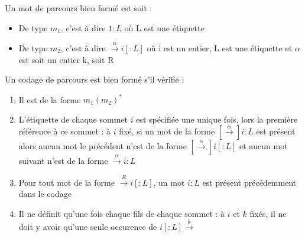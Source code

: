 \begin{defi}
\label{def-codage-bien-forme}
 Un mot de parcours bien formé est soit :
 \begin{itemize}
  \item De type $m_1$, c'est à dire $1:L$ où L est une étiquette
  \item De type $m_2$, c'est à dire $\xrightarrow{\alpha}i[:L]$ où i est un entier, L est une étiquette et $\alpha$ est soit un entier k, soit R
 \end{itemize}

 Un codage de parcours est bien formé s'il vérifie :
\begin{enumerate}
 \item Il est de la forme $m_1(m_2)^*$
 \item L'étiquette de chaque sommet $i$ est spécifiée une unique fois, lors la première référence à ce sommet : à $i$ fixé, si un mot de la forme $[\xrightarrow{\alpha}]i:L$ est présent alors aucun mot le précédent n'est de la forme $[\xrightarrow{\alpha}]i[:L]$ et aucun mot suivant n'est de la forme $\xrightarrow{\alpha}i:L$
 \item Pour tout mot de la forme $\xrightarrow{R}i[:L]$, un mot $i:L$ est présent précédemment dans le codage
 \item Il ne définit qu'une fois chaque fils de chaque sommet : à $i$ et $k$ fixés, il ne doit y avoir qu'une seule occurence de $i[:L]\xrightarrow{k}$
\end{enumerate} 
\end{defi}



